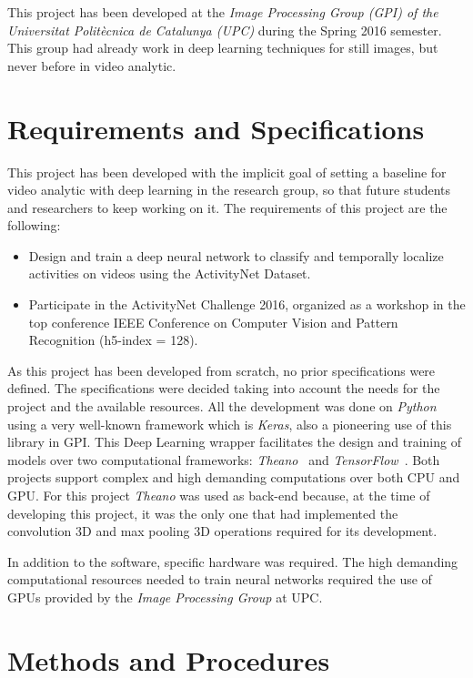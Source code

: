 This project has been developed at the \textit{Image Processing Group (GPI) of the Universitat Politècnica de Catalunya (UPC)} during the Spring 2016 semester. This group had already work in deep learning techniques for still images, but never before in video analytic.

\section{Requirements and Specifications}

This project has been developed with the implicit goal of setting a baseline for video analytic with deep learning in the research group, so that future students and researchers to keep working on it. The requirements of this project are the following:
\begin{itemize}
    \item Design and train a deep neural network to classify and temporally localize activities on videos using the ActivityNet Dataset.
    \item Participate in the ActivityNet Challenge 2016, organized as a workshop in the top conference IEEE Conference on Computer Vision and Pattern Recognition (h5-index = 128).
\end{itemize}

As this project has been developed from scratch, no prior specifications were defined. The specifications were decided taking into account the needs for the project and the available resources. All the development was done on \textit{Python} using a very well-known framework which is \textit{Keras}, also a pioneering use of this library in GPI. This Deep Learning wrapper facilitates the design and training of models over two computational frameworks: \textit{Theano}~\cite{theano2016theano} and \textit{TensorFlow}~\cite{abadi2016tensorflow}. Both  projects support complex and high demanding computations over both CPU and GPU. For this project \textit{Theano} was used as back-end because, at the time of developing this project, it was the only one that had implemented the convolution 3D and max pooling 3D operations required for its development.

In addition to the software, specific hardware was required. The high demanding computational resources needed to train neural networks required the use of GPUs provided by the \textit{Image Processing Group} at UPC.


\section{Methods and Procedures}


